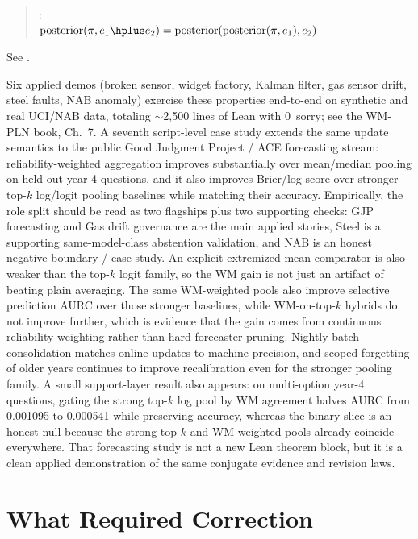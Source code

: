 \documentclass[11pt,openany]{report}
\begin{document}
\begin{quote}
: \\
$\text{posterior}(\pi, e_1 \hplus e_2)
  = \text{posterior}(\text{posterior}(\pi, e_1), e_2)$
\end{quote}

See .

Six applied demos (broken sensor, widget factory, Kalman filter, gas
sensor drift, steel faults, NAB anomaly) exercise these properties
end-to-end on synthetic and real UCI/NAB data, totaling $\sim$2{,}500
lines of Lean with 0~sorry; see the WM-PLN book, Ch.~7.  A seventh
script-level case study extends the same update semantics to the public
Good Judgment Project / ACE forecasting stream: reliability-weighted
aggregation improves substantially over mean/median pooling on held-out
year-4 questions, and it also improves Brier/log score over stronger
top-$k$ log/logit pooling baselines while matching their accuracy.
Empirically, the role split should be read as two flagships plus two
supporting checks: GJP forecasting and Gas drift governance are the main
applied stories, Steel is a supporting same-model-class abstention
validation, and NAB is an honest negative boundary / case study.
An explicit extremized-mean comparator is also weaker than the
top-$k$ logit family, so the WM gain is not just an artifact of beating
plain averaging.
The same WM-weighted pools also improve selective prediction AURC over
those stronger baselines, while WM-on-top-$k$ hybrids do not improve
further, which is evidence that the gain comes from continuous
reliability weighting rather than hard forecaster pruning.  Nightly
batch consolidation matches online updates to machine precision, and
scoped forgetting of older years continues to improve recalibration even
for the stronger pooling family.  A small support-layer result also
appears: on multi-option year-4 questions, gating the strong top-$k$
log pool by WM agreement halves AURC from 0.001095 to 0.000541 while
preserving accuracy, whereas the binary slice is an honest null because
the strong top-$k$ and WM-weighted pools already coincide everywhere.
That forecasting study is not a new
Lean theorem block, but it is a clean applied demonstration of the same
conjugate evidence and revision laws.

\section{What Required Correction}
\end{document}
